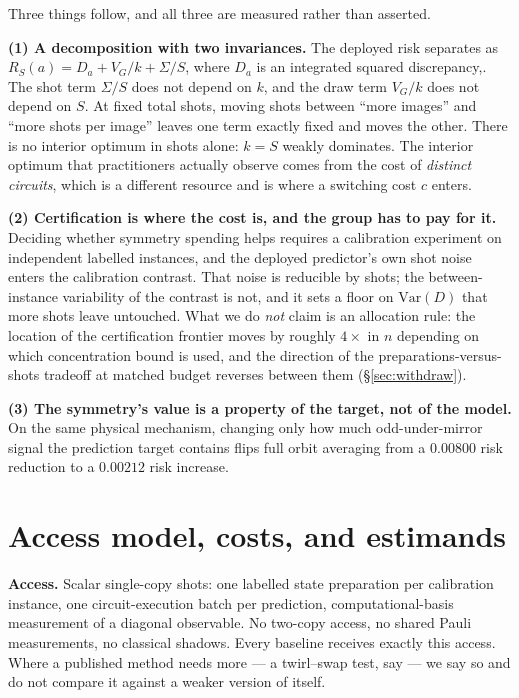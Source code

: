 \documentclass{article}
\newcommand{\risk}{R}
\begin{document}
Three things follow, and all three are measured rather than asserted.

\textbf{(1) A decomposition with two invariances.} The deployed risk separates as
$\risk_S(a)=D_a + V_G/k + \Sigma/S$, where $D_a$ is an integrated squared discrepancy,. The shot term $\Sigma/S$ does not depend on $k$, and
the draw term $V_G/k$ does not depend on $S$. At fixed total shots, moving shots between ``more
images'' and ``more shots per image'' leaves one term exactly fixed and moves the other. There is no
interior optimum in shots alone: $k=S$ weakly dominates. The interior optimum that practitioners
actually observe comes from the cost of \emph{distinct circuits}, which is a different resource and
is where a switching cost $c$ enters.

\textbf{(2) Certification is where the cost is, and the group has to pay for it.} Deciding
whether symmetry spending helps requires a calibration experiment on independent labelled instances,
and the deployed predictor's own shot noise enters the calibration contrast. That noise is reducible
by shots; the between-instance variability of the contrast is not, and it sets a floor on
$\mathrm{Var}(D)$ that more shots leave untouched. What we do \emph{not} claim is an allocation
rule: the location of the certification frontier moves by roughly $4\times$ in $n$ depending on
which concentration bound is used, and the direction of the preparations-versus-shots tradeoff at
matched budget reverses between them (\S\ref{sec:withdraw}).

\textbf{(3) The symmetry's value is a property of the target, not of the model.} On the same physical
mechanism, changing only how much odd-under-mirror signal the prediction target contains flips full
orbit averaging from a $0.00800$ risk reduction to a $0.00212$ risk increase.

\section{Access model, costs, and estimands}
\label{sec:access}

\textbf{Access.} Scalar single-copy shots: one labelled state preparation per calibration instance,
one circuit-execution batch per prediction, computational-basis measurement of a diagonal observable.
No two-copy access, no shared Pauli measurements, no classical shadows. Every baseline receives
exactly this access. Where a published method needs more --- a twirl--swap test, say --- we say so
and do not compare it against a weaker version of itself.
\end{document}
